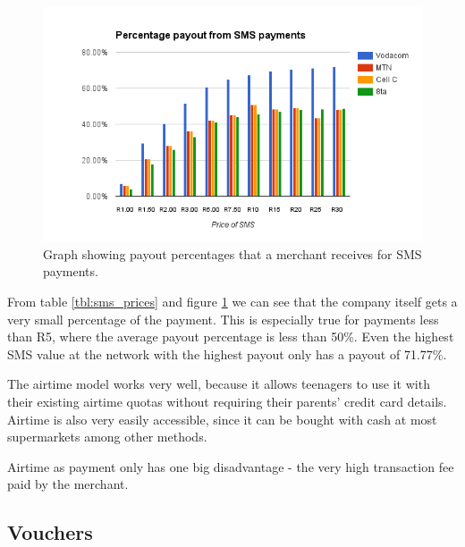 \begin{figure}
  \centering
   \caption{Graph showing payout percentages that a merchant receives for SMS payments.} 
    \includegraphics[width=\textwidth]{figs/sms_percentage.png}
  
   \label{fig:sms_percentage}
\end{figure}

From table \ref{tbl:sms_prices} and figure \ref{fig:sms_percentage} we can see that the company itself gets a very small percentage of the payment. This is especially true for payments less than R5, where the average payout percentage is less than 50\%. Even the highest SMS value at the network with the highest payout only has a payout of 71.77\%.


The airtime model works very well, because it allows teenagers to use it with their existing airtime quotas without requiring their parents' credit card details. Airtime is also very easily accessible, since it can be bought with cash at most supermarkets among other methods. 


Airtime as payment only has one big disadvantage - the very high transaction fee paid by the merchant. 


\subsection{Vouchers}

